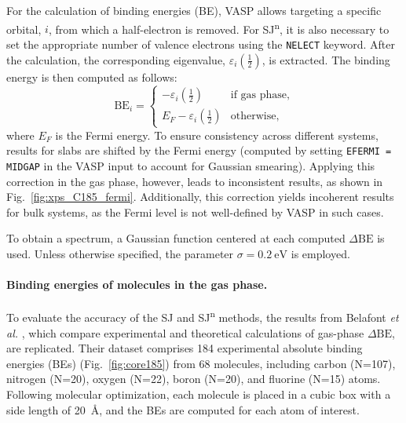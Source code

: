 \documentclass[12pt,a4paper]{article}
\def\dbe{\ensuremath{\Delta\text{BE}}}
\begin{document}
For the calculation of binding energies (BE), VASP allows targeting a specific orbital, $i$, from which a half-electron is removed. For SJ\textsuperscript{n}, it is also necessary to set the appropriate number of valence electrons using the \texttt{NELECT} keyword. After the calculation, the corresponding eigenvalue, $\varepsilon_i\left(\frac{1}{2}\right)$, is extracted. The binding energy is then computed as follows:
\begin{equation}
	\text{BE}_i = 	\begin{cases}
		-\varepsilon_i\left(\tfrac{1}{2}\right) & \text{if gas phase}, \\
		E_F - \varepsilon_i\left(\tfrac{1}{2}\right) & \text{otherwise}, \label{eq:xpsbe}
	\end{cases}
\end{equation}
where $E_F$ is the Fermi energy. To ensure consistency across different systems, results for slabs are shifted by the Fermi energy (computed by setting \texttt{EFERMI = MIDGAP} in the VASP input to account for Gaussian smearing). Applying this correction in the gas phase, however, leads to inconsistent results, as shown in Fig.~\ref{fig:xps_C185_fermi}. Additionally, this correction yields incoherent results for bulk systems, as the Fermi level is not well-defined by VASP in such cases.

To obtain a spectrum, a Gaussian function centered at each computed \dbe{} is used. Unless otherwise specified, the parameter $\sigma = \SI{0.2}{\electronvolt}$ is employed.

\paragraph{Binding energies of molecules in the gas phase.}
To evaluate the accuracy of the SJ and SJ\textsuperscript{n} methods, the results from Belafont \textit{et al.} \cite{pueyobellafontPredictingCoreLevel2017}, which compare experimental and theoretical calculations of gas-phase \dbe, are replicated. Their dataset comprises 184 experimental absolute binding energies (BEs) (Fig.~\ref{fig:core185}) from 68 molecules, including carbon (N=107), nitrogen (N=20), oxygen (N=22), boron (N=20), and fluorine (N=15) atoms. Following molecular optimization, each molecule is placed in a cubic box with a side length of \SI{20}{\angstrom}, and the BEs are computed for each atom of interest.
\end{document}
